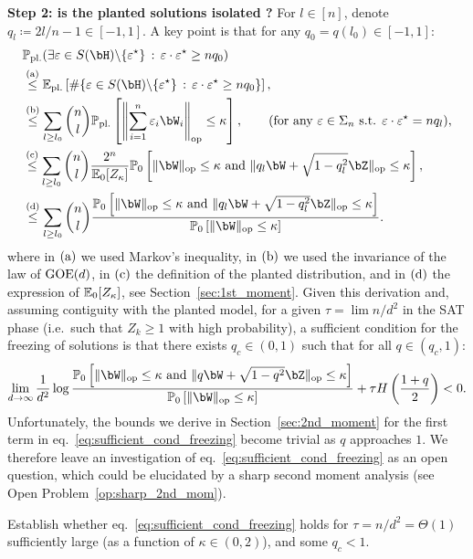 \myskip
\textbf{Step 2: is the planted solutions isolated ?}
For $l \in [n]$, denote $q_l \coloneqq 2l/n - 1 \in [-1,1]$.
A key point is that for any $q_0 = q(l_0) \in [-1,1]$:
\begin{align*}
    &\bbP_\pl(\exists \eps \in S(\bH) \backslash \{\eps^\star\} \, : \,  \eps \cdot \eps^\star \geq n q_0) \\
    &\aleq 
    \EE_\pl \left[\# \{\eps \in S(\bH) \backslash \{\eps^\star\} \, : \, \eps \cdot \eps^\star \geq n q_0\}\right], \\ 
    &\bleq \sum_{l \geq l_0} \binom{n}{l} \bbP_{\pl} \left[\left\|\sum_{i=1}^n \eps_i \bW_i\right\|_\op \leq \kappa\right], \hspace{20pt} (\textrm{for any } \eps \in \Sigma_n \textrm{ s.t. } \eps \cdot \eps^\star = n q_l), \\
    &\cleq \sum_{l \geq l_0}\binom{n}{l} \frac{2^n}{\EE_0[Z_\kappa]} \bbP_{0} \left[\|\bW\|_\op \leq \kappa \textrm{ and } \|q_l \bW + \sqrt{1-q_l^2} \bZ\|_\op \leq \kappa\right], \\
    &\dleq \sum_{l \geq l_0}\binom{n}{l} \frac{\bbP_{0} \left[\|\bW\|_\op \leq \kappa \textrm{ and } \|q_l \bW + \sqrt{1-q_l^2} \bZ\|_\op \leq \kappa\right]}{\bbP_{0} \left[\|\bW\|_\op \leq \kappa\right]}.
\end{align*}
where in $(\rm a)$ we used Markov's inequality, in $(\rm b)$ we used the invariance of the law of $\mathrm{GOE}(d)$, in $(\rm c)$ the definition of the planted distribution, and in $(\rm d)$ the expression of $\mathbb{E}_0[Z_\kappa]$, see Section~\ref{sec:1st_moment}.
Given this derivation and, assuming contiguity with the planted model, for a given $\tau = \lim n / d^2$ in the SAT phase (i.e.\ such that $Z_k \geq 1$ with high probability), a sufficient condition for the freezing of solutions 
is that there exists $q_c \in (0,1)$ such that for all $q \in (q_c, 1)$: 
\begin{align}\label{eq:sufficient_cond_freezing}
    \lim_{d \to \infty} \frac{1}{d^2} \log \frac{\bbP_0 \left[\|\bW\|_\op \leq \kappa \textrm{ and } \|q \bW + \sqrt{1-q^2} \bZ\|_\op \leq \kappa\right]}{\bbP_0 \left[\|\bW\|_\op \leq \kappa\right]} + \tau H\left(\frac{1+q}{2}\right) < 0.
\end{align}
Unfortunately, the bounds we derive in Section~\ref{sec:2nd_moment} for the first term in eq.~\eqref{eq:sufficient_cond_freezing} become trivial as $q$ approaches $1$. 
We therefore leave an investigation of eq.~\eqref{eq:sufficient_cond_freezing} as an open question, which could be elucidated by a sharp second moment analysis (see Open Problem~\ref{op:sharp_2nd_mom}).
\begin{openquestion}[Second moment potential close to $q = 1$]
    Establish whether eq.~\eqref{eq:sufficient_cond_freezing} holds for $\tau = n /d^2 = \Theta(1)$ sufficiently large (as a function of $\kappa \in (0,2)$), and some $q_c < 1$.
\end{openquestion}